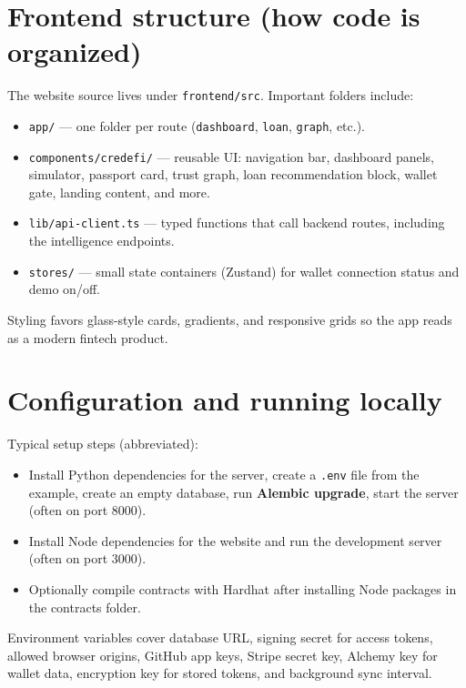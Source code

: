 \documentclass[11pt,a4paper]{article}
\begin{document}
\section{Frontend structure (how code is organized)}
The website source lives under \texttt{frontend/src}. Important folders include:

\begin{itemize}[leftmargin=*]
  \item \texttt{app/} --- one folder per route (\texttt{dashboard}, \texttt{loan}, \texttt{graph}, etc.).
  \item \texttt{components/credefi/} --- reusable UI: navigation bar, dashboard panels, simulator, passport card, trust graph, loan recommendation block, wallet gate, landing content, and more.
  \item \texttt{lib/api-client.ts} --- typed functions that call backend routes, including the intelligence endpoints.
  \item \texttt{stores/} --- small state containers (Zustand) for wallet connection status and demo on/off.
\end{itemize}

Styling favors glass-style cards, gradients, and responsive grids so the app reads as a modern fintech product.

\section{Configuration and running locally}
Typical setup steps (abbreviated):

\begin{itemize}[leftmargin=*]
  \item Install Python dependencies for the server, create a \texttt{.env} file from the example, create an empty database, run \textbf{Alembic upgrade}, start the server (often on port 8000).
  \item Install Node dependencies for the website and run the development server (often on port 3000).
  \item Optionally compile contracts with Hardhat after installing Node packages in the contracts folder.
\end{itemize}

Environment variables cover database URL, signing secret for access tokens, allowed browser origins, GitHub app keys, Stripe secret key, Alchemy key for wallet data, encryption key for stored tokens, and background sync interval.
\end{document}
